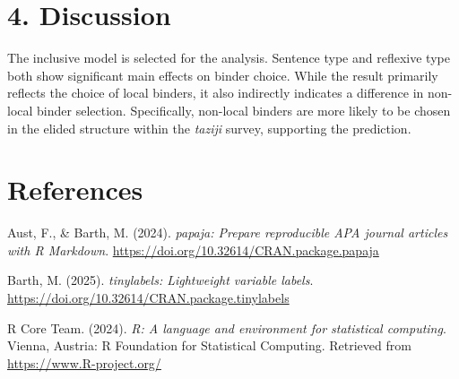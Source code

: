 \documentclass[
  man]{apa6}
\newlength{\cslhangindent}
\newenvironment{CSLReferences}[2] %
 {\begin{list}{}{%
  \setlength{\itemindent}{0pt}
  \setlength{\leftmargin}{0pt}
  \setlength{\parsep}{0pt}
  \ifodd #1
   \setlength{\leftmargin}{\cslhangindent}
   \setlength{\itemindent}{-1\cslhangindent}
  \fi
  \setlength{\itemsep}{#2\baselineskip}}}
 {\end{list}}
\begin{document}
\section{4. Discussion}\label{discussion}

The inclusive model is selected for the analysis. Sentence type and reflexive type both show significant main effects on binder choice. While the result primarily reflects the choice of local binders, it also indirectly indicates a difference in non-local binder selection. Specifically, non-local binders are more likely to be chosen in the elided structure within the \emph{taziji} survey, supporting the prediction.

\newpage

\section{References}\label{references}

\label{refs}
\begin{CSLReferences}{1}{0}
Aust, F., \& Barth, M. (2024). \emph{{papaja}: {Prepare} reproducible {APA} journal articles with {R Markdown}}. \url{https://doi.org/10.32614/CRAN.package.papaja}

Barth, M. (2025). \emph{{tinylabels}: Lightweight variable labels}. \url{https://doi.org/10.32614/CRAN.package.tinylabels}

R Core Team. (2024). \emph{R: A language and environment for statistical computing}. Vienna, Austria: R Foundation for Statistical Computing. Retrieved from \url{https://www.R-project.org/}

\end{CSLReferences}
\end{document}
